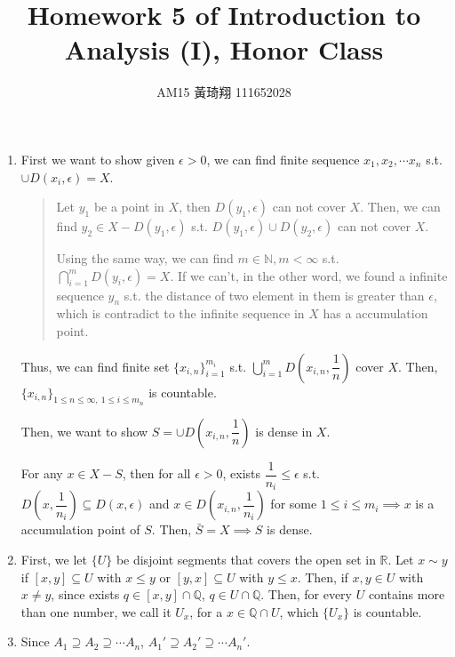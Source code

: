 \documentclass[12pt]{article}
\title{Homework 5 of Introduction to Analysis (I), Honor Class}
\author{AM15 黃琦翔 111652028}
\begin{document}
\maketitle
\begin{enumerate}
    \item First we want to show given $\epsilon > 0$, we can find finite sequence $x_1, x_2, \cdots x_n$ s.t. $\cup D(x_i, \epsilon) = X$.
    \begin{quote}
        Let $y_1$ be a point in $X$, then $D(y_1, \epsilon)$ can not cover $X$.
        Then, we can find $y_2\in X-D(y_1, \epsilon)$ s.t. $D(y_1, \epsilon) \cup D(y_2, \epsilon)$ can not cover $X$.

        Using the same way, we can find $m \in \mathbb{N}, m < \infty$ s.t. $\displaystyle\bigcap_{i=1}^m D(y_i, \epsilon) = X$.
        If we can't, in the other word, we found a infinite sequence $y_n$ s.t. the distance of two element in them is greater than $\epsilon$,
        which is contradict to the infinite sequence in $X$ has a accumulation point.
    \end{quote} 

    Thus, we can find finite set $\lbrace x_{i, n}\rbrace_{i=1}^{m_i}$ s.t. $\displaystyle\bigcup_{i=1}^{m} D(x_{i, n}, \dfrac{1}{n})$ cover $X$.
    Then, $\lbrace x_{i, n}\rbrace_{1\leq n\leq \infty,\ 1\leq i\leq m_n}$ is countable.

    Then, we want to show $S = \cup D(x_{i, n}, \dfrac{1}{n})$ is dense in $X$.

    For any $x\in X-S$, then for all $\epsilon > 0$, exists $\dfrac{1}{n_i} \leq \epsilon$ s.t. $D(x, \dfrac{1}{n_i})\subseteq D(x, \epsilon)$ and
    $x \in D(x_{i, n}, \dfrac{1}{n_i})$ for some $1\leq i \leq m_i\implies x$ is a accumulation point of $S$. Then, $\bar{S} = X\implies S$ is dense.


    \item First, we let $\lbrace U\rbrace$ be disjoint segments that covers the open set in $\mathbb{R}$.
    Let $x\sim y$ if $[x, y]\subseteq U$ with $x\leq y$ or $[y, x] \subseteq U$ with $y\leq x$.
    Then, if $x, y \in U$ with $x\neq y$, since exists $q \in [x, y]\cap \mathbb{Q}$, $q \in U\cap \mathbb{Q}$.
    Then, for every $U$ contains more than one number, we call it $U_x$, for a $x\in \mathbb{Q} \cap U$, which $\lbrace U_x \rbrace$ is countable.


    \newpage
    \item Since $A_1 \supseteq A_2\supseteq \cdots A_n$, $A_1' \supseteq A_2'\supseteq \cdots A_n'$.
    

\end{enumerate}
\end{document}
